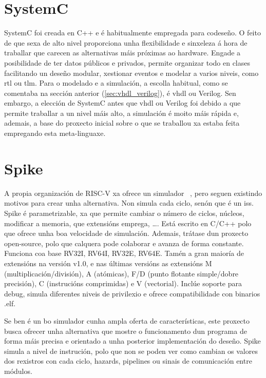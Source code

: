 \section{SystemC}\label{sec:systemc}
SystemC foi creada en C++ e é habitualmente empregada para codeseño. O feito de que sexa de alto nivel proporciona unha flexibilidade e sinxeleza á hora de traballar que carecen as alternativas máis próximas ao \gls{hardware}. Engade a posibilidade de ter datos públicos e privados, permite organizar todo en clases facilitando un deseño modular, xestionar eventos e modelar a varios niveis, como \acrfull{rtl} ou \acrfull{tlm}.
Para o modelado e a simulación, a escolla habitual, como se comentaba na sección anterior (\ref{sec:vhdl_verilog}), é \acrshort{vhdl} ou Verilog. Sen embargo, a elección de SystemC antes que \acrfull{vhdl} ou Verilog foi debido a que permite traballar a un nivel máis alto, a simulación é moito máis rápida e, ademais, a base do proxecto inicial sobre o que se traballou xa estaba feita empregando esta \gls{meta-linguaxe}.


\section{Spike}\label{sec:spike}
A propia organización de RISC-V xa ofrece un simulador ~\cite{sim_spike}, pero seguen existindo motivos para crear unha alternativa. Non simula cada ciclo, senón que é un \acrfull{iss}. Spike é parametrizable, xa que permite cambiar o número de ciclos, núcleos, modificar a memoria, que extensións emprega, \dots. Está escrito en C/C++ polo que ofrece unha boa velocidade de simulación. Ademais, trátase dun proxecto open-source, polo que calquera pode colaborar e  avanza de forma constante. Funciona coa base RV32I, RV64I, RV32E, RV64E. Tamén a gran maioría de extensións na versión v1.0, e nas últimas versións as extensións M (multiplicación/división), A (atómicas), F/D (punto flotante simple/dobre precisión), C (instrucións comprimidas) e V (vectorial). Inclúe soporte para debug, simula diferentes niveis de privilexio e ofrece compatibilidade con binarios .elf. 

Se ben é un bo simulador cunha ampla oferta de características, este proxecto busca ofrecer unha alternativa que mostre o funcionamento dun programa de forma máis precisa e orientado a unha posterior implementación do deseño. Spike simula a nivel de instrución, polo que non se poden ver como cambian os valores dos rexistros con cada ciclo, hazards, pipelines ou sinais de comunicación entre módulos.

